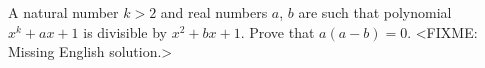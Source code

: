 \problem
A natural number $k > 2$ and real numbers $a$, $b$ are such that polynomial
$x^k + a x + 1$ is divisible by $x^2 + b x + 1$.
Prove that $a (a - b) = 0$.
\solution
<FIXME: Missing English solution.>
\endproblem
